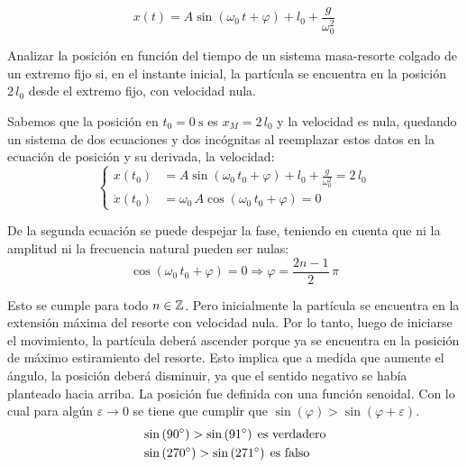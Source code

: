 \begin{mdframed}[style=DefinitionFrame]
    \begin{defn}
    \end{defn}
    \begin{equation*}
        x(t) = A \sin{(\omega_0 \, t + \varphi)} + l_0 + \frac{g}{\omega_0^2}
    \end{equation*}
\end{mdframed}

\begin{mdframed}[style=ExampleFrame]
    \begin{example}
    \end{example}
    \begin{formatI}
        Analizar la posición en función del tiempo de un sistema masa-resorte colgado de un extremo fijo si, en el instante inicial, la partícula se encuentra en la posición $2 \, l_0$ desde el extremo fijo, con velocidad nula.
    \end{formatI}
    Sabemos que la posición en $t_0 = \SI{0}{\second}$ es $x_M = 2 \,l_0$ y la velocidad es nula, quedando un sistema de dos ecuaciones y dos incógnitas al reemplazar estos datos en la ecuación de posición y su derivada, la velocidad:
    \[
      \left\{
        \begin{aligned}
          x(t_0) &= A \sin{(\omega_0 \, t_0 + \varphi)} + l_0 + \frac{g}{\omega_0^2} = 2 \, l_0
          \\
          \dot{x}(t_0) &= \omega_0 \, A \cos{(\omega_0 \, t_0 + \varphi)} = 0
        \end{aligned}
      \right.
    \]
    
    De la segunda ecuación se puede despejar la fase, teniendo en cuenta que ni la amplitud ni la frecuencia natural pueden ser nulas:
    \[ \cos{(\omega_0 \, t_0 + \varphi)} = 0 \Rightarrow \varphi = \frac{2n-1}{2} \, \pi \]
    
    Esto se cumple para todo $n \in \mathbb{Z}$.
    Pero inicialmente la partícula se encuentra en la extensión máxima del resorte con velocidad nula.
    Por lo tanto, luego de iniciarse el movimiento, la partícula deberá ascender porque ya se encuentra en la posición de máximo estiramiento del resorte.
    Esto implica que a medida que aumente el ángulo, la posición deberá disminuir, ya que el sentido negativo se había planteado hacia arriba.
    La posición fue definida con una función senoidal.
    Con lo cual para algún $\varepsilon \to 0$ se tiene que cumplir que $\sin(\varphi)>\sin(\varphi+\varepsilon)$.
    \begin{align*}
        & \sin{(90^{\circ})} > \sin{(91^{\circ})} \hspace{1ex} \text{es verdadero}
        \\
        & \sin{(270^{\circ})} > \sin{(271^{\circ})} \hspace{1ex} \text{es falso}
    \end{align*}
    

\end{mdframed}
